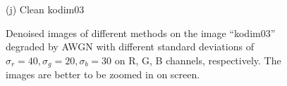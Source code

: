 \documentclass[10pt,onecolumn,letterpaper]{article}
\begin{document}
\begin{figure}
{\begin{minipage}[t]{0.195\textwidth}
{\footnotesize (j) Clean kodim03}
\end{minipage}
}
\caption{Denoised images of different methods on the image ``kodim03'' degraded by AWGN with different standard deviations of $\sigma_{r}=40, \sigma_{g}=20, \sigma_{b}=30$ on R, G, B channels, respectively. The images are better to be zoomed in on screen.}
\label{f1}
\vspace{2mm}
\end{figure}
\end{document}
